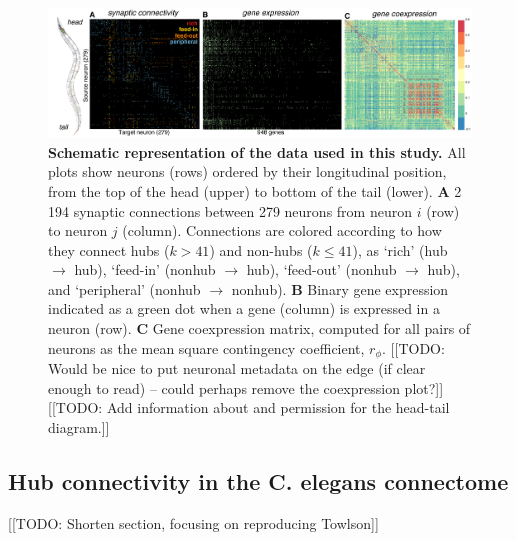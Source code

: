 \documentclass[10pt,letterpaper]{article}
\begin{document}
\begin{figure}[t]
  \centering
    \includegraphics[width=1\textwidth]{schematic.pdf}
 \caption{\textbf{Schematic representation of the data used in this study.}
All plots show neurons (rows) ordered by their longitudinal position, from the top of the head (upper) to bottom of the tail (lower).
 \textbf{A} 2\,194 synaptic connections between 279 neurons from neuron $i$ (row) to neuron $j$ (column).
Connections are colored according to how they connect hubs ($k > 41$) and non-hubs ($k \leq 41$), as `rich' (hub $\rightarrow$ hub), `feed-in' (nonhub $\rightarrow$ hub), `feed-out' (nonhub $\rightarrow$ hub), and `peripheral' (nonhub $\rightarrow$ nonhub). 
  \textbf{B} Binary gene expression indicated as a green dot when a gene (column) is expressed in a neuron (row).
 \textbf{C} Gene coexpression matrix, computed for all pairs of neurons as the mean square contingency coefficient, $r_\phi$.
[[TODO: Would be nice to put neuronal metadata on the edge (if clear enough to read) -- could perhaps remove the coexpression plot?]]
[[TODO: Add information about and permission for the head-tail diagram.]]
}
\label{fig:SchematicRepresentation}
\end{figure}


\subsection*{Hub connectivity in the C. elegans connectome}
[[TODO: Shorten section, focusing on reproducing Towlson]]
\end{document}
